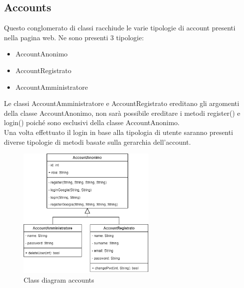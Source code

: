 \documentclass[a4paper,12pt]{article}
\begin{document}
\subsection{Accounts}
Questo conglomerato di classi racchiude le varie tipologie di account presenti nella pagina web. Ne sono presenti 3 tipologie: 
\begin{itemize}
    \item AccountAnonimo
    \item AccountRegistrato
    \item AccountAmministratore
\end{itemize} 
Le classi AccountAmministratore e AccountRegistrato ereditano gli argomenti della classe AccountAnonimo, non sarà possibile ereditare i metodi register() e login() poiché sono esclusivi della classe AccountAnonimo.\\
Una volta effettuato il login in base alla tipologia di utente saranno presenti diverse tipologie di metodi basate sulla gerarchia dell'account.
\begin{figure}[H]
   \centering
    \includegraphics[width=0.6\textwidth]{D3/img/class_diagram_accounts.png}
    \caption{Class diagram accounts}
\end{figure}

\newpage
\end{document}
